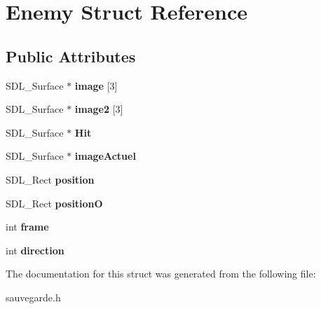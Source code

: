 \hypertarget{structEnemy}{}\section{Enemy Struct Reference}
\label{structEnemy}
\subsection*{Public Attributes}
\begin{DoxyCompactItemize}
\item 
\mbox{\label{structEnemy_afc1cf868e4b6602d2166ee9cfbf1d06e}} 
S\+D\+L\+\_\+\+Surface $\ast$ {\bfseries image} \mbox{[}3\mbox{]}
\item 
\mbox{\label{structEnemy_a43bdca7bc81657fccdb7d8cb7369f673}} 
S\+D\+L\+\_\+\+Surface $\ast$ {\bfseries image2} \mbox{[}3\mbox{]}
\item 
\mbox{\label{structEnemy_a62ed00c1aa4ac7bb90cb132c6c56b21d}} 
S\+D\+L\+\_\+\+Surface $\ast$ {\bfseries Hit}
\item 
\mbox{\label{structEnemy_ab8d7f9eceeef8f17331210f3f1fd2cf3}} 
S\+D\+L\+\_\+\+Surface $\ast$ {\bfseries image\+Actuel}
\item 
\mbox{\label{structEnemy_ac364f2ddf130c8622889deca0b6ba4d0}} 
S\+D\+L\+\_\+\+Rect {\bfseries position}
\item 
\mbox{\label{structEnemy_ab2e55fdee92a7689185599a67f726b41}} 
S\+D\+L\+\_\+\+Rect {\bfseries positionO}
\item 
\mbox{\label{structEnemy_a554574b1537da808a14f909b8a701735}} 
int {\bfseries frame}
\item 
\mbox{\label{structEnemy_a1de1605c4b41f74c3b0f4023258323ab}} 
int {\bfseries direction}
\end{DoxyCompactItemize}


The documentation for this struct was generated from the following file\+:\begin{DoxyCompactItemize}
\item 
sauvegarde.\+h\end{DoxyCompactItemize}

